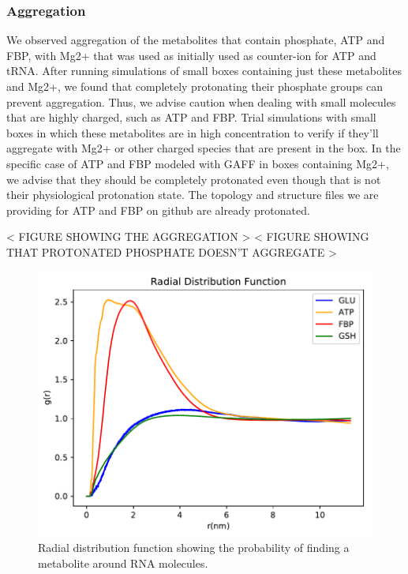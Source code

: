\documentclass[journal=jacsat,manuscript=article]{achemso}
\begin{document}
\subsubsection{Aggregation}
We observed aggregation of the metabolites that contain phosphate, ATP and FBP, with Mg2+ that was used as initially used as counter-ion for ATP and tRNA. After running simulations of small boxes containing just these metabolites and Mg2+, we found that completely protonating their phosphate groups can prevent aggregation. Thus, we advise caution when dealing with small molecules that are highly charged, such as ATP and FBP. Trial simulations with small boxes in which these metabolites are in high concentration to verify if they'll aggregate with Mg2+ or other charged species that are present in the box. In the specific case of ATP and FBP modeled with GAFF in boxes containing Mg2+, we advise that they should be completely protonated even though that is not their physiological protonation state. The topology and structure files we are providing for ATP and FBP on github are already protonated.

< FIGURE SHOWING THE AGGREGATION >
< FIGURE SHOWING THAT PROTONATED PHOSPHATE DOESN'T AGGREGATE >



\begin{figure}
\includegraphics[scale=0.6]{rdf_RNA_metabolites.pdf}
\caption{Radial distribution function showing the probability of finding a metabolite around RNA molecules.}
\end{figure}
\end{document}
